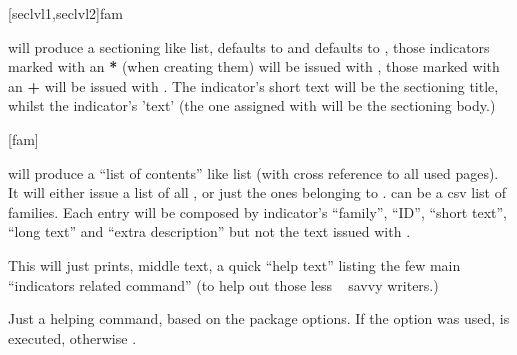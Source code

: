 \documentclass[dctools,english]{ufrgscca} %
\begin{document}
\begin{Macros}{\lstind}
	\begin{Syntax}%
	\Macro{\lstind}[seclvl1,seclvl2]{fam}
\end{Syntax}
\Macro{\lstind}{} will produce a sectioning like list,  defaults to \Macro{\section}{} and  defaults to \Macro{\subsection}{}, those indicators marked with an \textbf{*} (when creating them) will be issued with , those marked with an \textbf{+} will be issued with . The indicator's short text will be the sectioning title, whilst the indicator's 'text' (the one assigned with  will be the sectioning body.)
\end{Macros}

\begin{Macros}{\PrintIndicators}
    \begin{Syntax}%
        \Macro{\PrintIndicators}[fam]{}
    \end{Syntax}
    \Macro{\PrintIndicators}{} will produce a “list of contents” like list (with cross reference to all used \Macro{\indref}{} pages). It will either issue a list of all \Macro{\declareindicator}, or just the ones belonging to .  can be a csv list of families. Each entry will be composed by indicator's “family”, “ID”, “short text”, “long text” and “extra description” but not the text issued with \Macro{\indicatorText}{}.
\end{Macros}


\begin{Macros}{\helpindicators}
	\begin{Syntax}%
	\Macro{\helpindicators}{}
\end{Syntax}
This will just prints, middle text, a quick “help text” listing the few main “indicators related command” (to help out those less \LaTeXe~ savvy writers.)
\end{Macros}

\begin{Macros}{ \ifshowind}
    \begin{Syntax}%
    \end{Syntax}
Just a helping command, based on the package options. If the option  was used,  is executed, otherwise .
\end{Macros}
\end{document}
